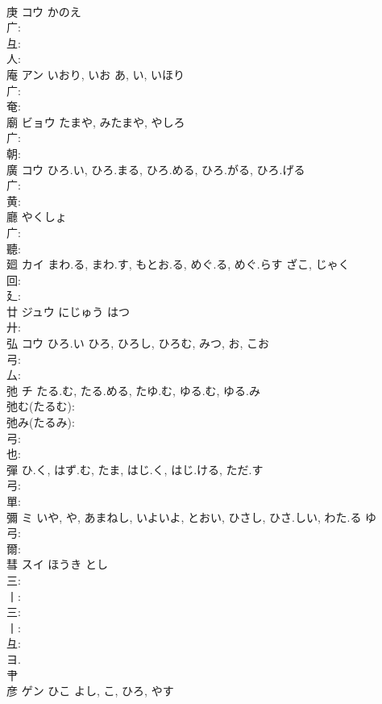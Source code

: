 \documentclass[8pt]{extreport}
\begin{document}
\begin{CJK}{UTF8}{min}
\\	庚	コウ	かのえ		
\\	广: 
\\	彑: 
\\	人: 
\\	庵	アン	いおり, いお	あ, い, いほり	
\\	广: 
\\	奄: 
\\	廟	ビョウ	たまや, みたまや, やしろ		
\\	广: 
\\	朝: 
\\	廣	コウ	ひろ.い, ひろ.まる, ひろ.める, ひろ.がる, ひろ.げる		
\\	广: 
\\	黄: 
\\	廳		やくしょ				
\\	广: 
\\	聽: 
\\	廻	カイ	まわ.る, まわ.す, もとお.る, めぐ.る, めぐ.らす	ざこ, じゃく	
\\	回: 
\\	廴: 
\\	廿	ジュウ	にじゅう	はつ	
\\	廾: 
\\	弘	コウ	ひろ.い	ひろ, ひろし, ひろむ, みつ, お, こお	
\\	弓: 
\\	厶: 
\\	弛	チ	たる.む, たる.める, たゆ.む, ゆる.む, ゆる.み		
\\	弛む(たるむ): 
\\	弛み(たるみ): 
\\	弓: 
\\	也: 
\\	彈		ひ.く, はず.む, たま, はじ.く, はじ.ける, ただ.す				
\\	弓: 
\\	單: 
\\	彌	ミ	いや, や, あまねし, いよいよ, とおい, ひさし, ひさ.しい, わた.る	ゆ			
\\	弓: 
\\	爾: 
\\	彗	スイ	ほうき	とし	
\\	三: 
\\	丨: 
\\	三: 
\\	丨: 
\\	彑: 
\\	ヨ. 
\\	肀 
\\	彦	ゲン	ひこ	よし, こ, ひろ, やす	

\end{CJK}
\end{document}
